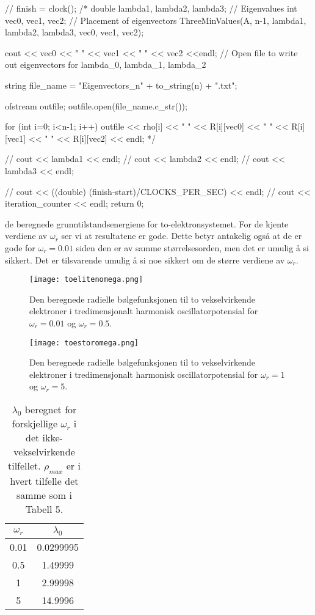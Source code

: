 \documentclass[norsk, 12pt]{article}
\begin{document}
{//    finish = clock();
/*
    double lambda1, lambda2, lambda3;   // Eigenvalues
    int vec0, vec1, vec2;               // Placement of eigenvectors
    ThreeMinValues(A, n-1, lambda1, lambda2, lambda3, vec0, vec1, vec2);

    cout << vec0 << "   " << vec1 << "  " << vec2 <<endl;
    // Open file to write out eigenvectors for lambda_0, lambda_1, lambda_2


    string file_name = "Eigenvectors_n" + to_string(n) + ".txt";

    ofstream outfile;
    outfile.open(file_name.c_str());

    for (int i=0; i<n-1; i++){
        outfile << rho[i] << "  " << R[i][vec0] << "     " << R[i][vec1] << "   " << R[i][vec2] << endl;
    }
*/

//    cout << lambda1 << endl;
//    cout << lambda2 << endl;
//    cout << lambda3 << endl;

//    cout << ((double) (finish-start)/CLOCKS_PER_SEC) << endl;
//    cout << iteration_counter << endl;
    return 0;
}


de beregnede grunntilstandsenergiene for to-elektronsystemet. For de kjente verdiene av $\omega_r$ ser
vi at resultatene er gode. Dette betyr antakelig også at de er gode for $\omega_r=0.01$ siden den er av samme størrelsesorden, 
men det er umulig å si sikkert. Det er tilsvarende umulig å si noe sikkert om de større verdiene av $\omega_r$.


\begin{figure}[!htb]
 \centering
 \texttt{[image: toelitenomega.png]}
 \caption{Den beregnede radielle bølgefunksjonen til to vekselvirkende elektroner i tredimensjonalt
 harmonisk oscillatorpotensial for $\omega_r=0.01$ og $\omega_r=0.5$.}
\end{figure}

\begin{figure}[!htb]
 \centering
 \texttt{[image: toestoromega.png]}
 \caption{Den beregnede radielle bølgefunksjonen til to vekselvirkende elektroner i tredimensjonalt
 harmonisk oscillatorpotensial for $\omega_r=1$ og $\omega_r=5$.}
\end{figure}

\begin{table}[h!]
 \centering
 \begin{tabular}{|c|c|}\hline
  $\omega_r$ & $\lambda_0$\\ \hline
  0.01 & 0.0299995\\
  0.5 & 1.49999\\
  1 & 2.99998\\
  5 & 14.9996\\ \hline
 \end{tabular}
\caption{$\lambda_0$ beregnet for forskjellige $\omega_r$ i det ikke-vekselvirkende tilfellet. $\rho_{max}$ er i hvert tilfelle
det samme som i Tabell 5.}
\end{table}
\end{document}
